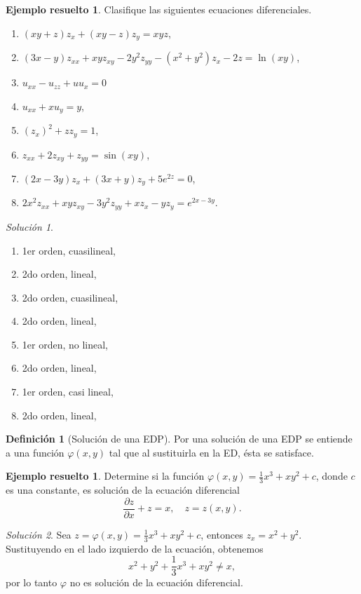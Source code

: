 \documentclass[11pt,letterpaper,draft]{report}
\theoremstyle{plain}
\theoremstyle{definition}
\newtheorem{definition}[theorem]{Definición}
\newtheorem{solved}[theorem]{Ejemplo resuelto}
\theoremstyle{remark}
\newtheorem*{solution}{Solución}
\newcommand\<{\langle}
\renewcommand\>{\rangle}
\renewcommand\phi\varphi
\begin{document}
\begin{solved}
  Clasifique las siguientes ecuaciones diferenciales.
  \begin{enumerate}
    \item \((xy+z)z_x + (xy-z)z_y = xyz\),
    \item \((3x-y)z_{xx} + xyz_{xy} -2y^{2}z_{yy} -
      (x^{2}+y^{2})z_x-2z = \ln(xy)\),
    \item \(u_{xx}-u_{zz}+uu_x = 0\) 
    \item \(u_{xx}+xu_y=y\),
    \item \((z_x)^{2}+zz_y=1\),
    \item \(z_{xx}+2z_{xy}+z_{yy} = \sin(xy)\),
    \item \((2x-3y)z_x+(3x+y)z_y+5e^{2z}=0\),
    \item \(2x^{2}z_{xx}+xyz_{xy}-3y^{2}z_{yy}+xz_x-yz_y=e^{2x-3y}\).
  \end{enumerate}
  \begin{solution} \leavevmode
    \begin{enumerate}
      \item 1er orden, cuasilineal,
      \item 2do orden, lineal,
      \item 2do orden, cuasilineal,
      \item 2do orden, lineal,
      \item 1er orden, no lineal,
      \item 2do orden, lineal,
      \item 1er orden, casi lineal,
      \item 2do orden, lineal,
    \end{enumerate}
  \end{solution}
\end{solved}

\begin{definition}[Solución de una EDP]
  Por una solución de una EDP se entiende a una función
  $\phi(x,y)$ tal que al sustituirla en la ED, ésta se
  satisface.
\end{definition}

\begin{solved}
  Determine si la función $\displaystyle \phi(x,y) =
  \frac{1}{3}x^3 + xy^2 + c$, donde $c$ es una constante, es
  solución de la ecuación diferencial
  \[
    \frac{\partial z}{\partial x} + z = x, \quad z = z(x,y).
  \] 

  \begin{solution}
    Sea $z = \phi(x,y) = \frac{1}{3}x^3 + xy^2 + c$,
    entonces $z_x = x^2 + y^2$.
    Sustituyendo en el lado izquierdo de la ecuación, obtenemos
    \[
    x^2 + y^2 + \frac{1}{3}x^3 + xy^2 \neq x,
    \] por lo tanto $\phi$ no es solución de la ecuación
    diferencial.
  \end{solution}
\end{solved}
\end{document}
